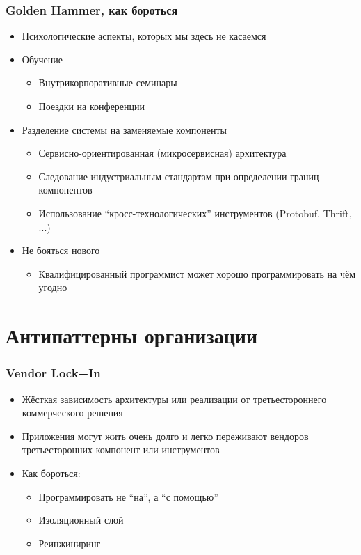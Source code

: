 \documentclass{../../slides-style}
\begin{document}
    \begin{frame}
        \frametitle{Golden Hammer, как бороться}
        \begin{itemize}
            \item Психологические аспекты, которых мы здесь не касаемся
            \item Обучение
            \begin{itemize}
                \item Внутрикорпоративные семинары
                \item Поездки на конференции
            \end{itemize}
            \item Разделение системы на заменяемые компоненты
            \begin{itemize}
                \item Сервисно-ориентированная (микросервисная) архитектура
                \item Следование индустриальным стандартам при определении границ компонентов
                \item Использование ``кросс-технологических'' инструментов (Protobuf, Thrift, ...)
            \end{itemize}
            \item Не бояться нового
            \begin{itemize}
                \item Квалифицированный программист может хорошо программировать на чём угодно
            \end{itemize}
        \end{itemize}
    \end{frame}

    \section{Антипаттерны организации}

    \begin{frame}
        \frametitle{Vendor Lock−In}
        \begin{itemize}
            \item Жёсткая зависимость архитектуры или реализации от третьестороннего коммерческого решения
            \item Приложения могут жить очень долго и легко переживают вендоров третьесторонних компонент или инструментов
            \item Как бороться:
            \begin{itemize}
                \item Программировать не ``на'', а ``с помощью''
                \item Изоляционный слой
                \item Реинжиниринг
            \end{itemize}
        \end{itemize}
    \end{frame}
\end{document}
